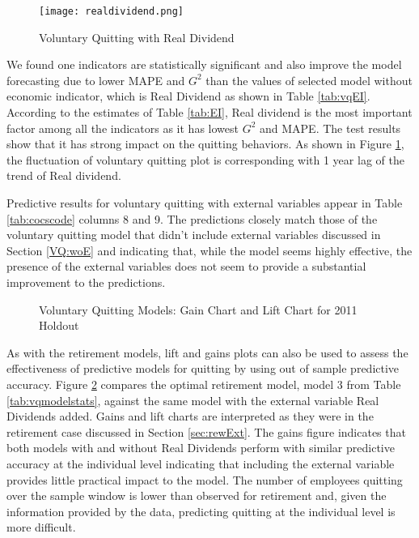 \documentclass[12pt,letterpaper]{article}
\begin{document}
\begin{figure}
	\centering
	\texttt{[image: realdividend.png]}
	\caption{Voluntary Quitting with Real Dividend}
	\label{fig:vqrealdividend}
\end{figure}
We found one indicators are statistically significant and also improve the model forecasting due to lower MAPE and $G^2$ than the values of selected model without economic indicator, which is Real Dividend as shown in Table \ref{tab:vqEI}. According to the estimates of Table \ref{tab:EI}, Real dividend is the most important factor among all the indicators as it has lowest $G^2$ and MAPE. The test results show that it has strong impact on the quitting behaviors. As shown in Figure \ref{fig:vqrealdividend}, the fluctuation of voluntary quitting plot is corresponding with 1 year lag of the trend of Real dividend.


Predictive results for voluntary quitting with external variables appear in Table \ref{tab:cocscode} columns 8 and 9.  The predictions closely match those of the voluntary quitting model that didn't include external variables discussed in Section \ref{VQ:woE} and indicating that, while the model seems highly effective, the presence of the external variables does not seem to provide a substantial improvement to the predictions.

\begin{figure}[h!]
 	\centering
  	\caption{Voluntary Quitting Models: Gain Chart and Lift Chart for 2011 Holdout}
 	\label{fig:vqgainlift}
 \end{figure}

As with the retirement models, lift and gains plots can also be used to assess the effectiveness of predictive models for quitting by using out of sample predictive accuracy.  Figure \ref{fig:vqgainlift} compares the optimal retirement model, model 3 from Table \ref{tab:vqmodelstats}, against the same model with the external variable Real Dividends added.  Gains and lift charts are interpreted as they were in the retirement case discussed in Section \ref{sec:rewExt}.  The gains figure indicates that both models with and without Real Dividends perform with similar predictive accuracy at the individual level indicating that including the external variable provides little practical impact to the model.  The number of employees quitting over the sample window is lower than observed for retirement and, given the information provided by the data, predicting quitting at the individual level is more difficult.
\end{document}
